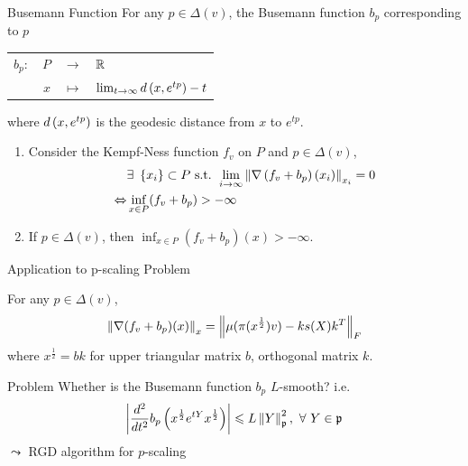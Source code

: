 \documentclass{beamer}
\begin{document}
	\begin{frame}{Busemann Function}
		For any $p \in \Delta(v)$, the Busemann function $b_p$ corresponding to $p$
		\begin{center}
			\begin{tabular}{rrcl}
				$b_p \colon$ & $P$ & $\longrightarrow$ & $\mathbb{R}$\\
				~ & $x$ & $\longmapsto$ & $\lim_{t \rightarrow \infty}d\left(x,e^{tp}\right)-t$
			\end{tabular}
		\end{center}
		where $d\left(x,e^{tp}\right)$ is the geodesic distance from $x$ to $e^{tp}$.
		\begin{thm}
			\begin{enumerate}
				\item Consider the Kempf-Ness function $f_v$ on $P$ and $p \in \Delta(v)$,
					\vspace{-0.5em}
					\begin{equation*}
						\begin{split}
							~&\exists~\bb{x_i} \subset P \text{ s.t. }\lim_{i \sto \infty}\norm{\nabla \bc{f_v+b_p}(x_i)}_{x_i} = 0 \\
							\Leftrightarrow& \inf_{x \in P} (f_v + b_p) > -\infty
						\end{split}
						\vspace{-0.5em}
					\end{equation*}
				\item If $p \in \Delta(v)$, then $\inf_{x \in P} (f_v + b_p)(x) > -\infty$.
			\end{enumerate}
		\end{thm}
	\end{frame}

	\begin{frame}{Application to p-scaling Problem}
		\begin{prop}
			For any $p \in \Delta(v)$,
			\vspace{-0.5em} 
			\begin{equation*}
				\norm{\nabla(f_v+b_p)(x)}_{x} = \norm{\mu(\pi(x^{\frac{1}{2}})v)-ks(X)k^T}_{F}
				\vspace{-0.5em}
			\end{equation*}
			where $x^{\frac{1}{2}} = bk$ for upper triangular matrix $b$, orthogonal matrix $k$.
		\end{prop}

		\begin{block}{Problem}
			Whether is the Busemann function $b_p$ $L$-smooth? i.e.
			\vspace{-0.5em} 
			\begin{equation*}
				\abs{\frac{d^2}{dt^2}b_p\bc{x^{\frac{1}{2}}e^{tY}x^{\frac{1}{2}}}} \leqslant L\norm{Y}^2_{\alg{p}},~\forall~Y \in \alg{p}
				\vspace{-0.5em}
			\end{equation*}
			$\leadsto$ RGD algorithm for $p$-scaling
		\end{block}


	\end{frame}
\end{document}
